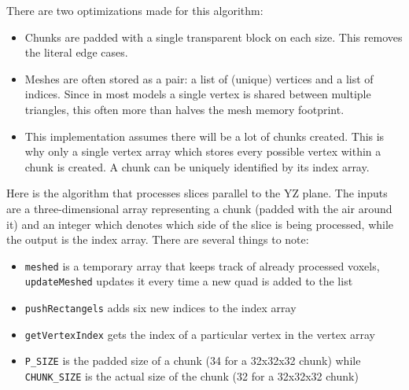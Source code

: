 \documentclass[times, utf8, zavrsni, numeric]{fer}
\begin{document}
There are two optimizations made for this algorithm:
\begin{itemize}
\item Chunks are padded with a single transparent block on each size. This removes the literal edge cases.
\item Meshes are often stored as a pair: a list of (unique) vertices and a list of indices. Since in most models a single vertex is shared between multiple triangles, this often more than halves the mesh memory footprint.
\item This implementation assumes there will be a lot of chunks created. This is why only a single vertex array which stores every possible vertex within a chunk is created. A chunk can be uniquely identified by its index array.
\end{itemize}

Here is the algorithm that processes slices parallel to the YZ plane. The inputs are a three-dimensional array representing a chunk (padded with the air around it) and an integer which denotes which side of the slice is being processed, while the output is the index array. There are several things to note:
\begin{itemize}
\item \texttt{meshed} is a temporary array that keeps track of already processed voxels, \texttt{updateMeshed} updates it every time a new quad is added to the list
\item \texttt{pushRectangels} adds six new indices to the index array
\item \texttt{getVertexIndex} gets the index of a particular vertex in the vertex array
\item \texttt{P\_SIZE} is the padded size of a chunk (34 for a 32x32x32 chunk) while \texttt{CHUNK\_SIZE} is the actual size of the chunk (32 for a 32x32x32 chunk)
\end{itemize}
\end{document}
